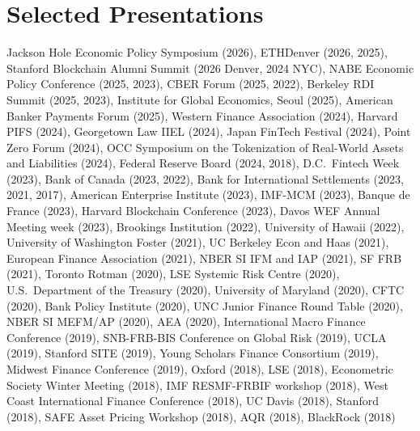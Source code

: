 \documentclass[10.5pt]{article}
\begin{document}
\section{Selected Presentations}
{\color{inkgray}
Jackson Hole Economic Policy Symposium (2026), ETHDenver (2026, 2025), Stanford Blockchain Alumni Summit (2026 Denver, 2024 NYC), NABE Economic Policy Conference (2025, 2023), CBER Forum (2025, 2022), Berkeley RDI Summit (2025, 2023), Institute for Global Economics, Seoul (2025), American Banker Payments Forum (2025), Western Finance Association (2024), Harvard PIFS (2024), Georgetown Law IIEL (2024), Japan FinTech Festival (2024), Point Zero Forum (2024), OCC Symposium on the Tokenization of Real-World Assets and Liabilities (2024), Federal Reserve Board (2024, 2018), D.C.\ Fintech Week (2023), Bank of Canada (2023, 2022), Bank for International Settlements (2023, 2021, 2017), American Enterprise Institute (2023), IMF-MCM (2023), Banque de France (2023), Harvard Blockchain Conference (2023), Davos WEF Annual Meeting week (2023), Brookings Institution (2022), University of Hawaii (2022), University of Washington Foster (2021), UC Berkeley Econ and Haas (2021), European Finance Association (2021), NBER SI IFM and IAP (2021), SF FRB (2021), Toronto Rotman (2020), LSE Systemic Risk Centre (2020), U.S.\ Department of the Treasury (2020), University of Maryland (2020), CFTC (2020), Bank Policy Institute (2020), UNC Junior Finance Round Table (2020), NBER SI MEFM/AP (2020), AEA (2020), International Macro Finance Conference (2019), SNB-FRB-BIS Conference on Global Risk (2019), UCLA (2019), Stanford SITE (2019), Young Scholars Finance Consortium (2019), Midwest Finance Conference (2019), Oxford (2018), LSE (2018), Econometric Society Winter Meeting (2018), IMF RESMF-FRBIF workshop (2018), West Coast International Finance Conference (2018), UC Davis (2018), Stanford (2018), SAFE Asset Pricing Workshop (2018), AQR (2018), BlackRock (2018)
}
\end{document}
